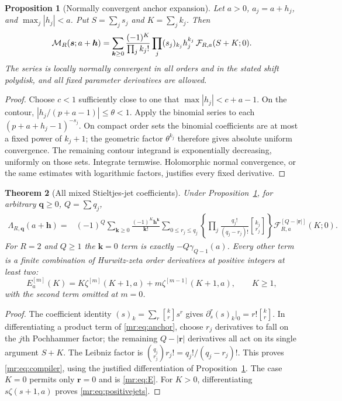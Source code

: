 \documentclass[11pt,letterpaper]{article}
\newtheorem{theorem}{Theorem}[section]
\newtheorem{proposition}[theorem]{Proposition}
\theoremstyle{definition}\newtheorem{definition}[theorem]{Definition}
\theoremstyle{remark}\newtheorem{remark}[theorem]{Remark}
\newcommand{\F}{\mathcal F}\newcommand{\B}{\mathcal B}
\newcommand{\stir}[2]{\genfrac{[}{]}{0pt}{}{#1}{#2}}
\begin{document}
\begin{proposition}[Normally convergent anchor expansion]\label{mr:prop:anchor}
Let $a>0$, $a_j=a+h_j$, and $\max_j|h_j|<a$. Put
$S=\sum_js_j$ and $K=\sum_jk_j$. Then
\begin{equation}\label{mr:eq:anchor}
 \M_R(\boldsymbol s;a+\boldsymbol h)=
 \sum_{\boldsymbol k\ge0}\frac{(-1)^K}{\prod_jk_j!}
 \prod_j(s_j)_{k_j}h_j^{k_j}\,
 \F_{R,a}(S+K;0).
\end{equation}
The series is locally normally convergent in all orders and in the
stated shift polydisk, and all fixed parameter derivatives are allowed.
\end{proposition}
\begin{proof}
Choose $c<1$ sufficiently close to one that
$\max|h_j|<c+a-1$. On the contour,
$|h_j/(p+a-1)|\le\theta<1$. Apply the binomial series to each
$(p+a+h_j-1)^{-s_j}$. On compact order sets the binomial coefficients
are at most a fixed power of $k_j+1$; the geometric factor $\theta^{k_j}$
therefore gives absolute uniform convergence. The remaining contour
integrand is exponentially decreasing, uniformly on those sets.
Integrate termwise. Holomorphic normal convergence, or the same estimates
with logarithmic factors, justifies every fixed derivative.
\end{proof}

\begin{theorem}[All mixed Stieltjes-jet coefficients]\label{mr:thm:compiler}
Under Proposition~\ref{mr:prop:anchor}, for arbitrary
$\boldsymbol q\ge0$, $Q=\sum q_j$,
\begin{align}
 \Lambda_{R,\boldsymbol q}(a+\boldsymbol h)
 ={}&(-1)^Q\sum_{\boldsymbol k\ge0}
       \frac{(-1)^K\boldsymbol h^{\boldsymbol k}}{\boldsymbol k!}
 \sum_{0\le r_j\le q_j}
 \left\{\prod_j\frac{q_j!}{(q_j-r_j)!}\stir{k_j}{r_j}\right\}
 \F_{R,a}^{[Q-|\boldsymbol r|]}(K;0).
 \label{mr:eq:compiler}
\end{align}
For $R=2$ and $Q\ge1$ the $\boldsymbol k=0$ term is exactly
$-Q\gamma_{Q-1}(a)$. Every other term is a finite combination of
Hurwitz-zeta order derivatives at positive integers at least two:
\begin{equation}\label{mr:eq:positivejets}
 E_a^{[m]}(K)=K\zeta^{[m]}(K+1,a)
             +m\zeta^{[m-1]}(K+1,a),\qquad K\ge1,
\end{equation}
with the second term omitted at $m=0$.
\end{theorem}
\begin{proof}
The coefficient identity
$(s)_k=\sum_r\stir{k}{r}s^r$ gives
$\partial_s^r(s)_k|_0=r!\stir{k}{r}$.
In differentiating a product term of \eqref{mr:eq:anchor}, choose $r_j$
derivatives to fall on the $j$th Pochhammer factor; the remaining
$Q-|\boldsymbol r|$ derivatives all act on its single argument $S+K$.
The Leibniz factor is
$\binom{q_j}{r_j}r_j!=q_j!/(q_j-r_j)!$.
This proves \eqref{mr:eq:compiler}, using the justified differentiation
of Proposition~\ref{mr:prop:anchor}. The case $K=0$ permits only
$\boldsymbol r=0$ and is \eqref{mr:eq:E}. For $K>0$, differentiating
$s\zeta(s+1,a)$ proves \eqref{mr:eq:positivejets}.
\end{proof}
\end{document}
